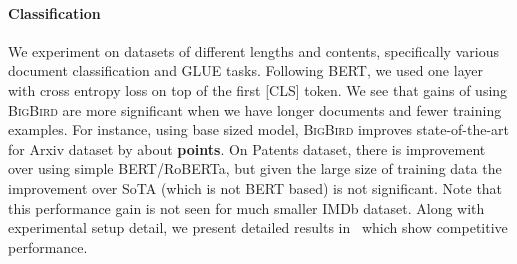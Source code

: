 \documentclass{article}
\newcommand{\bigb}{\textsc{BigBird}\xspace}
\begin{document}
\paragraph{Classification} 
We experiment on datasets of different lengths and contents, specifically various document classification and GLUE tasks.
Following BERT, we used one layer with cross entropy loss on top of the first [CLS] token.
We see that gains of using \bigb are more significant when we have longer documents and fewer training examples.
For instance, using base sized model,
\bigb improves state-of-the-art for Arxiv dataset by about  \textbf{points}.
On Patents dataset, there is improvement over using simple BERT/RoBERTa, but given the large size of training data the improvement over SoTA (which is not BERT based) is not significant.
Note that this performance gain is not seen for much
smaller IMDb dataset.
Along with experimental setup detail, we present detailed results in~ which show competitive performance.
\end{document}
